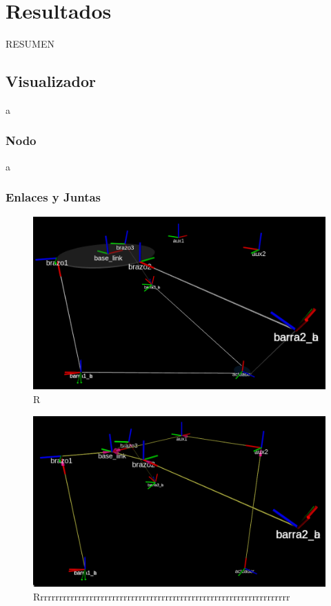 \chapter{Resultados}\label{CAP7}
RESUMEN 


\section{Visualizador}
a
    \subsection{Nodo}
    a

\newpage

    \subsection{Enlaces y Juntas}
        \begin{figure}[h]
            \centering
            \includegraphics[width=0.86\linewidth]{Main/Chapter7/Images7/rviz_2.png}
            \caption{R}
            \label{f:cap7_rviz_2}
        \end{figure}  
    \begin{figure}[h]
            \centering
            \includegraphics[width=0.86\linewidth]{Main/Chapter7/Images7/rviz_3.png}
            \caption{Rrrrrrrrrrrrrrrrrrrrrrrrrrrrrrrrrrrrrrrrrrrrrrrrrrrrrrrrrrrrrrrrrrr}
            \label{f:cap7_rviz_3}
        \end{figure}  

